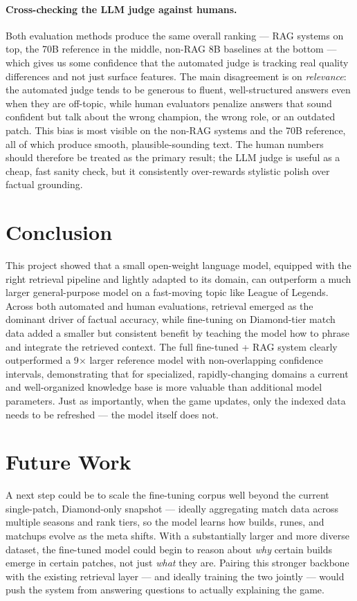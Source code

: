\documentclass[fleqn,moreauthors,10pt]{ds_report}
\begin{document}
\paragraph{Cross-checking the LLM judge against humans.}
Both evaluation methods produce the same overall ranking — RAG systems on top, the 70B reference in the middle, non-RAG 8B baselines at the bottom — which gives us some confidence that the automated judge is tracking real quality differences and not just surface features. The main disagreement is on \textit{relevance}: the automated judge tends to be generous to fluent, well-structured answers even when they are off-topic, while human evaluators penalize answers that sound confident but talk about the wrong champion, the wrong role, or an outdated patch. This bias is most visible on the non-RAG systems and the 70B reference, all of which produce smooth, plausible-sounding text. The human numbers should therefore be treated as the primary result; the LLM judge is useful as a cheap, fast sanity check, but it consistently over-rewards stylistic polish over factual grounding.

\section*{Conclusion}

This project showed that a small open-weight language model, equipped with the right retrieval pipeline and lightly adapted to its domain, can outperform a much larger general-purpose model on a fast-moving topic like League of Legends. Across both automated and human evaluations, retrieval emerged as the dominant driver of factual accuracy, while fine-tuning on Diamond-tier match data added a smaller but consistent benefit by teaching the model how to phrase and integrate the retrieved context. The full fine-tuned + RAG system clearly outperformed a 9$\times$ larger reference model with non-overlapping confidence intervals, demonstrating that for specialized, rapidly-changing domains a current and well-organized knowledge base is more valuable than additional model parameters. Just as importantly, when the game updates, only the indexed data needs to be refreshed — the model itself does not.

\section*{Future Work}

A next step could be to scale the fine-tuning corpus well beyond the current single-patch, Diamond-only snapshot — ideally aggregating match data across multiple seasons and rank tiers, so the model learns how builds, runes, and matchups evolve as the meta shifts. With a substantially larger and more diverse dataset, the fine-tuned model could begin to reason about \emph{why} certain builds emerge in certain patches, not just \emph{what} they are. Pairing this stronger backbone with the existing retrieval layer — and ideally training the two jointly — would push the system from answering questions to actually explaining the game.
\end{document}
